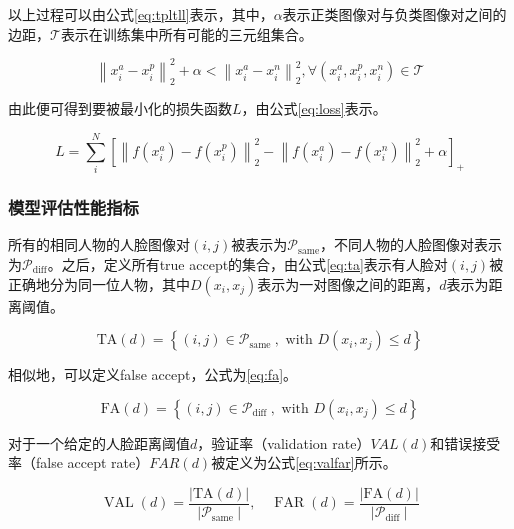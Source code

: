 以上过程可以由公式\ref{eq:tpltll}表示，其中，$\alpha$表示正类图像对与负类图像对之间的边距，$\mathcal{T}$表示在训练集中所有可能的三元组集合。

\begin{equation}
    \left\|x_{i}^{a}-x_{i}^{p}\right\|_{2}^{2}+\alpha<\left\|x_{i}^{a}-x_{i}^{n}\right\|_{2}^{2}, \forall\left(x_{i}^{a}, x_{i}^{p}, x_{i}^{n}\right) \in \mathcal{T}
    \label{eq:tpltll}
\end{equation}

由此便可得到要被最小化的损失函数$L$，由公式\ref{eq:loss}表示。

\begin{equation}
    L=\sum_{i}^{N}\left[\left\|f\left(x_{i}^{a}\right)-f\left(x_{i}^{p}\right)\right\|_{2}^{2}-\left\|f\left(x_{i}^{a}\right)-f\left(x_{i}^{n}\right)\right\|_{2}^{2}+\alpha\right]_{+}
    \label{eq:loss}
\end{equation}

\subsubsection{模型评估性能指标}

所有的相同人物的人脸图像对$(i,j)$被表示为$\mathcal{P}_{\text {same}}$，不同人物的人脸图像对表示为$\mathcal{P}_{\text {diff}}$。之后，定义所有true accept的集合，由公式\ref{eq:ta}表示有人脸对$(i,j)$被正确地分为同一位人物，其中$D\left(x_{i}, x_{j}\right)$表示为一对图像之间的距离，$d$表示为距离阈值。

\begin{equation}
    \mathrm{TA}(d)=\left\{(i, j) \in \mathcal{P}_{\text {same }}, \text { with } D\left(x_{i}, x_{j}\right) \leq d\right\}
    \label{eq:ta}
\end{equation}

相似地，可以定义false accept，公式为\ref{eq:fa}。

\begin{equation}
    \mathrm{FA}(d)=\left\{(i, j) \in \mathcal{P}_{\text {diff }}, \text { with } D\left(x_{i}, x_{j}\right) \leq d\right\}
    \label{eq:fa}
\end{equation}

对于一个给定的人脸距离阈值$d$，验证率（validation rate）$VAL(d)$和错误接受率（false accept rate）$FAR(d)$被定义为公式\ref{eq:valfar}所示。

\begin{equation}
    \operatorname{VAL}(d)=\frac{|\mathrm{TA}(d)|}{\left|\mathcal{P}_{\text {same }}\right|}, \quad \operatorname{FAR}(d)=\frac{|\mathrm{FA}(d)|}{\left|\mathcal{P}_{\text {diff }}\right|}
    \label{eq:valfar}
\end{equation}

